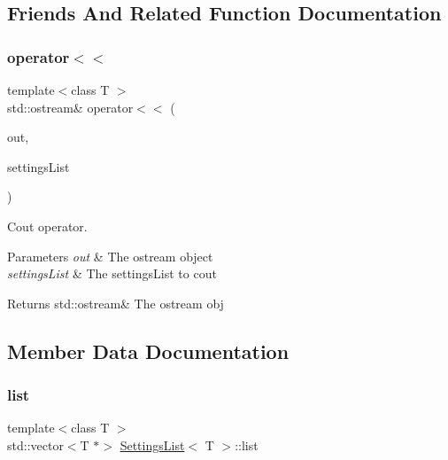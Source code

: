 \subsection{Friends And Related Function Documentation}
\mbox{\label{class_settings_list_a7f03f8e5d27c4270224302acc75580ff}} 
\subsubsection{\texorpdfstring{operator$<$$<$}{operator<<}}
{\footnotesize\ttfamily template$<$class T $>$ \\
std\+::ostream\& operator$<$$<$ (\begin{DoxyParamCaption}\item[{std\+::ostream \&}]{out,  }\item[{const \hyperlink{class_settings_list}{Settings\+List}$<$ T $>$ \&}]{settings\+List }\end{DoxyParamCaption})\hspace{0.3cm}{\ttfamily [friend]}}



Cout operator. 


\begin{DoxyParams}{Parameters}
{\em out} & The ostream object \\
\hline
{\em settings\+List} & The settings\+List to cout \\
\hline
\end{DoxyParams}
\begin{DoxyReturn}{Returns}
std\+::ostream\& The ostream obj 
\end{DoxyReturn}


\subsection{Member Data Documentation}
\mbox{\label{class_settings_list_ad0c1155cd75a37372384c9adb8bfc748}} 
\subsubsection{\texorpdfstring{list}{list}}
{\footnotesize\ttfamily template$<$class T $>$ \\
std\+::vector$<$T $\ast$$>$ \hyperlink{class_settings_list}{Settings\+List}$<$ T $>$\+::list}

